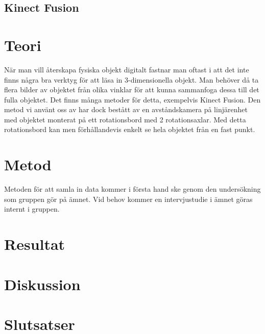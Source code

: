 \subsection{Kinect Fusion}

\section{Teori}
\label{sec:theory-karlsson}

När man vill återskapa fysiska objekt digitalt fastnar man oftast i att det inte finns några bra verktyg för att läsa in 3-dimensionella objekt. Man behöver då ta flera bilder av objektet från olika vinklar för att kunna sammanfoga dessa till det fulla objektet. Det finns många metoder för detta, exempelvis Kinect Fusion. Den metod vi använt oss av har dock bestått av en avståndskamera på linjärenhet med objektet monterat på ett rotationsbord med 2 rotationsaxlar. Med detta rotationsbord kan men förhållandevis enkelt se hela objektet från en fast punkt.

\section{Metod}
\label{sec:method-karlsson}


Metoden för att samla in data kommer i första hand ske genom den undersökning som gruppen gör på ämnet. Vid behov kommer en intervjustudie i ämnet göras internt i gruppen. 


\section{Resultat}
\label{sec:results-karlsson}


\section{Diskussion}
\label{sec:discussion-karlsson}


\section{Slutsatser}
\label{sec:conclusions-karlsson}


